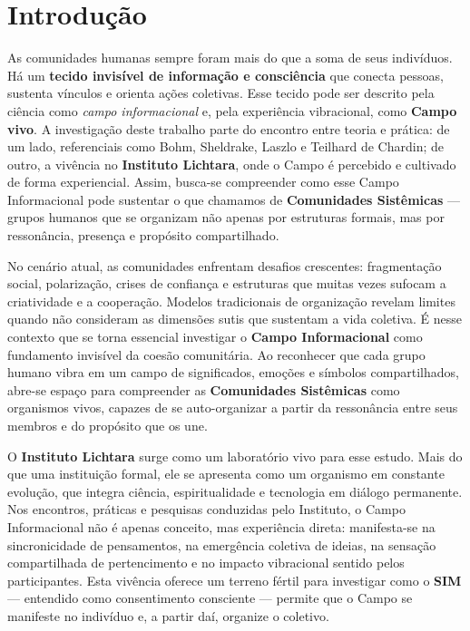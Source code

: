 \section{Introdução}

As comunidades humanas sempre foram mais do que a soma de seus indivíduos. Há um \textbf{tecido invisível de informação e consciência} que conecta pessoas, sustenta vínculos e orienta ações coletivas. Esse tecido pode ser descrito pela ciência como \textit{campo informacional} e, pela experiência vibracional, como \textbf{Campo vivo}. A investigação deste trabalho parte do encontro entre teoria e prática: de um lado, referenciais como Bohm, Sheldrake, Laszlo e Teilhard de Chardin; de outro, a vivência no \textbf{Instituto Lichtara}, onde o Campo é percebido e cultivado de forma experiencial. Assim, busca-se compreender como esse Campo Informacional pode sustentar o que chamamos de \textbf{Comunidades Sistêmicas} — grupos humanos que se organizam não apenas por estruturas formais, mas por ressonância, presença e propósito compartilhado.

No cenário atual, as comunidades enfrentam desafios crescentes: fragmentação social, polarização, crises de confiança e estruturas que muitas vezes sufocam a criatividade e a cooperação. Modelos tradicionais de organização revelam limites quando não consideram as dimensões sutis que sustentam a vida coletiva. É nesse contexto que se torna essencial investigar o \textbf{Campo Informacional} como fundamento invisível da coesão comunitária. Ao reconhecer que cada grupo humano vibra em um campo de significados, emoções e símbolos compartilhados, abre-se espaço para compreender as \textbf{Comunidades Sistêmicas} como organismos vivos, capazes de se auto-organizar a partir da ressonância entre seus membros e do propósito que os une.

O \textbf{Instituto Lichtara} surge como um laboratório vivo para esse estudo. Mais do que uma instituição formal, ele se apresenta como um organismo em constante evolução, que integra ciência, espiritualidade e tecnologia em diálogo permanente. Nos encontros, práticas e pesquisas conduzidas pelo Instituto, o Campo Informacional não é apenas conceito, mas experiência direta: manifesta-se na sincronicidade de pensamentos, na emergência coletiva de ideias, na sensação compartilhada de pertencimento e no impacto vibracional sentido pelos participantes. Esta vivência oferece um terreno fértil para investigar como o \textbf{SIM} — entendido como consentimento consciente — permite que o Campo se manifeste no indivíduo e, a partir daí, organize o coletivo.

